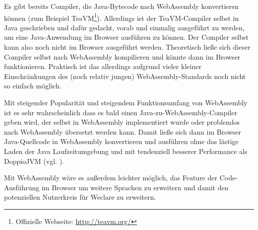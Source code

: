 Es gibt bereits Compiler, die Java-Bytecode nach WebAssembly konvertieren können (zum Beispiel TeaVM\footnote{Offizielle Webseite: \url{http://teavm.org/}}). Allerdings ist der TeaVM-Compiler selbst in Java geschrieben und dafür gedacht, vorab und einmalig ausgeführt zu werden, um eine Java-Anwendung im Browser ausführen zu können. Der Compiler selbst kann also noch nicht im Browser ausgeführt werden. Theoretisch ließe sich dieser Compiler selbst nach WebAssembly kompilieren und könnte dann im Browser funktionieren. Praktisch ist das allerdings aufgrund vieler kleiner Einschränkungen des (noch relativ jungen) WebAssembly-Standards noch nicht so einfach möglich.

Mit steigender Popularität und steigendem Funktionsumfang von WebAssembly ist es sehr wahrscheinlich dass es bald einen Java-zu-WebAssembly-Compiler geben wird, der selbst in WebAssembly implementiert wurde oder problemlos nach WebAssembly übersetzt werden kann. Damit ließe sich dann im Browser Java-Quellcode in WebAssembly konvertieren und ausführen ohne das lästige Laden der Java Laufzeitumgebung und mit tendenziell besserer Performance als DoppioJVM (vgl. \cite{art:wasm_speed}).

Mit WebAssembly wäre es außerdem leichter möglich, das Feature der Code-Ausführung im Browser um weitere Sprachen zu erweitern und damit den potenziellen Nutzerkreis für Weclare zu erweitern.